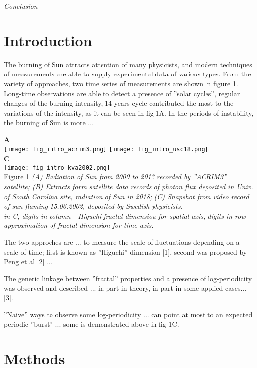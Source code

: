 \documentclass[a4paper]{article}
\begin{document}
\textit{Conclusion}

\newpage
\section*{Introduction}

The burning of Sun attracts attention of many physicists, and modern techniques of measurements are able to supply experimental data of various types. From the variety of approaches, two time series of measurements are shown in figure 1. Long-time observations are able to detect a presence of ''solar cycles'', regular changes of the burning intensity, 14-years cycle contributed the most to the variations of the intensity, as it can be seen in fig 1A. In the periods of instability, the burning of Sun is more ...

\noindent
{\large{\textbf{A}}} \\
\texttt{[image: fig\_intro\_acrim3.png]}
\texttt{[image: fig\_intro\_usc18.png]}\\
\vskip 12pt
\noindent
{\large{\textbf{C}}}\\
\texttt{[image: fig\_intro\_kva2002.png]}\\
\vskip 12pt
Figure 1 \textit{(A) Radiation of Sun from 2000 to 2013 recorded by ''ACRIM3'' satellite; (B) Extracts form satellite data records of photon flux deposited in Univ. of South Carolina site, radiation of Sun in 2018; (C) Snapshot from video record of sun flaming 15.06.2002, deposited by Swedish physicists.\\ \small{in C,  digits in column - Higuchi fractal dimension for spatial axis, digits in row - approximation of fractal dimension for time axis.}}

The two approches are ... to measure the scale of fluctuations depending on a scale of time; first is known as ''Higuchi'' dimension [1], second was proposed by Peng et al [2] ...

The generic linkage between ''fractal'' properties and a presence of log-periodicity was observed and described ... in part in theory, in part in some applied cases... [3].

''Naive'' ways to observe some log-periodicity ... can point at most to an expected periodic ''burst'' ... some is demonstrated above in fig 1C.

\newpage
\section*{Methods}
\end{document}
